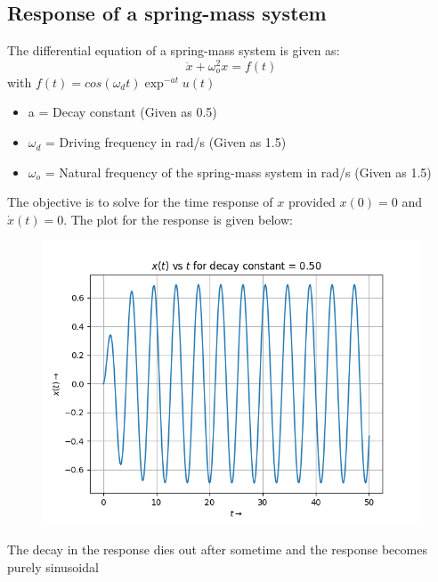 \documentclass[12pt, a4paper]{article}
\begin{document}
\subsection{Response of a spring-mass system}
The differential equation of a spring-mass system is given as:
\begin{equation*}
    \ddot x + \omega _{o}^{2}x = f(t)
\end{equation*}
with $f(t) = cos(\omega _{d}t)\exp ^{-at}u(t)$
\begin{itemize}
    \item a = Decay constant (Given as 0.5)
    \item $\omega _{d}$ = Driving frequency in rad/s (Given as 1.5)
    \item $\omega _{o}$ = Natural frequency of the spring-mass system in rad/s (Given as 1.5)
\end{itemize}
The objective is to solve for the time response of $x$ provided $x(0) = 0$ and $\dot x(t) = 0$. The plot for the response is given below:
\vspace*{-0.5cm}
\begin{figure}[H]
    \centering
    \includegraphics[scale = 0.8]{Figure_1.png}
    \label{fig:sample}
\end{figure}
\begin{center}
    The decay in the response dies out after sometime and the response becomes
purely sinusoidal
\end{center}
\vspace*{-0.5cm}
\end{document}
